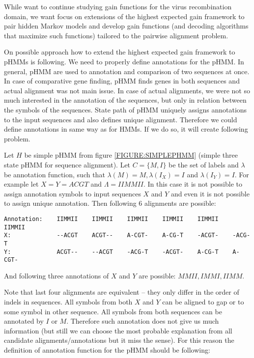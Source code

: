 While want to continue studying gain functions for the virus recombination
domain, we want focus on extensions of the highest expected gain framework to
pair hidden Markov models and develop gain functions (and decoding algorithms
that maximize such functions) tailored to the pairwise alignment problem. 

On possible approach how to extend the highest expected gain framework to pHMMs
is following.  We need to properly define annotations for the pHMM. In general,
pHMM are used to annotation and comparison of two sequences at once. In case of
comparative gene finding, pHMM finds genes in both sequences and actual
alignment was not main issue. In case of actual alignments, we were not so much
interested in the annotation of the sequences, but only in relation between the
symbols of the sequences. State path of pHMM uniquely assigns annotations to the
input sequences and also defines unique alignment.  Therefore we could define
annotations in same way as for HMMs. If we do so, it will create following
problem.

Let $H$ be simple pHMM from figure \ref{FIGURE:SIMPLEPHMM} (simple three state
pHMM for sequence alignment). Let $C=\{M,I\}$ be the set of labels and 
$\lambda$ be annotation function, such that $\lambda(M)=M, \lambda(I_X)=I$ and
$\lambda(I_Y)=I$.   For example let $X=Y=ACGT$ and $\Lambda = IIMMII$.
In this case it is not possible to assign annotation symbols
to input sequences $X$ and $Y$ and even it is not possible to assign unique
annotation.
Then
following $6$ alignments are possible:
\begin{verbatim}
Annotation:    IIMMII    IIMMII    IIMMII    IIMMII    IIMMII    IIMMII
X:             --ACGT    ACGT--    A-CGT-    A-CG-T    -ACGT-    -ACG-T
Y:             ACGT--    --ACGT    -ACG-T    -ACGT-    A-CG-T    A-CGT-
\end{verbatim}
And following three annotations of $X$ and $Y$ are possible: $MMII,IMMI,IIMM$.

Note that last four  alignments are equivalent -- they only differ in the order
of indels in sequences. All symbols from both $X$ and $Y$ can be aligned to gap
or to some symbol in other sequence. All symbols from both sequences can be
annotated by $I$ or $M$. Therefore such annotation does not give us much
information (but still we can choose the most probable explanation from all
candidate alignments/annotations but it miss the sense).
For this reason the definition of annotation function for the pHMM
should be following:

